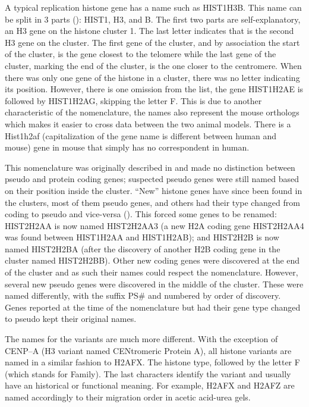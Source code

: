 \documentclass[10pt,a4paper,twocolumn,article]{memoir}
\begin{document}
      A typical replication histone gene has a name such as HIST1H3B. This name can be split in
      3 parts (): HIST1, H3, and B. The first two parts are self-explanatory,
      an H3 gene on the histone cluster 1. The last letter indicates that is the second H3 gene on the cluster.
      The first gene of the cluster, and by association the start of the cluster, is the gene closest to the telomere
      while the last gene of the cluster, marking the end of the cluster, is the one closer to the centromere. When
      there was only one gene of the histone in a cluster, there was no letter indicating its position. However, there is
      one omission from the list, the gene HIST1H2AE is followed by HIST1H2AG, skipping the letter F. This is due
      to another characteristic of the nomenclature, the names also represent the mouse orthologs which makes it easier
      to cross data between the two animal models. There is a Hist1h2af (capitalization
      of the gene name is different between human and mouse) gene in mouse that simply has no correspondent in human.

      This nomenclature was originally described in \cite{Marzluff02} and made no distinction between
      pseudo and protein coding genes; suspected pseudo genes were still named based on their position
      inside the cluster. ``New'' histone genes have since been found in the clusters,
      most of them pseudo genes, and others had their type changed from coding to pseudo and
      vice-versa ().
      This forced some genes to be renamed: HIST2H2AA is now named HIST2H2AA3 (a new H2A coding gene
      HIST2H2AA4 was found between HIST1H2AA and HIST1H2AB);
      and HIST2H2B is now named HIST2H2BA (after the discovery of another H2B coding gene in the
      cluster named HIST2H2BB).
      Other new coding genes were discovered at the end of the cluster and as such their names could respect the nomenclature. However,
      several new pseudo genes were discovered in the middle of the cluster. These were named differently, with the suffix PS\#
      and numbered by order of discovery. Genes reported at the time of the nomenclature but had their gene type changed to pseudo
      kept their original names.


      The names for the variants are much more different. With the exception of CENP--A (H3 variant named CENtromeric Protein A),
      all histone variants are named in a similar fashion to H2AFX. The histone type, followed by the letter F (which stands for
      Family). The last characters identify the variant and usually have an historical or functional meaning. For example, H2AFX
      and H2AFZ are named accordingly to their migration order in acetic acid-urea gels.
\end{document}
